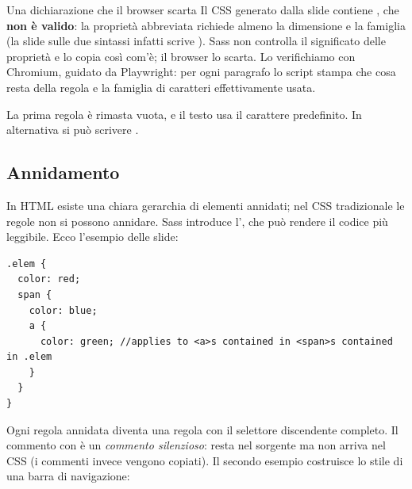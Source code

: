 \begin{warningbox}{{Una dichiarazione che il browser scarta}}
  Il CSS generato dalla slide contiene , che
  \textbf{non è valido}: la proprietà abbreviata  richiede almeno la
  dimensione e la famiglia (la slide sulle due sintassi infatti scrive
  ). Sass non controlla il significato delle
  proprietà e lo copia così com'è; il browser lo scarta. Lo verifichiamo con
  Chromium, guidato da Playwright: per ogni paragrafo lo script stampa che cosa
  resta della regola e la famiglia di caratteri effettivamente usata.


  La prima regola è rimasta vuota, e il testo usa il carattere predefinito. In
  alternativa si può scrivere .
\end{warningbox}

\subsection{Annidamento}

In HTML esiste una chiara gerarchia di elementi annidati; nel CSS tradizionale
le regole non si possono annidare. Sass introduce l', che può
rendere il codice più leggibile. Ecco l'esempio delle slide:

\begin{affianco}[0.55]
\begin{lstlisting}[style=css, name=elem.scss, morecomment={[l]{//}}]
.elem {
  color: red;
  span {
    color: blue;
    a {
      color: green; //applies to <a>s contained in <span>s contained in .elem
    }
  }
}
\end{lstlisting}
\risultato
{}
\end{affianco}

Ogni regola annidata diventa una regola con il selettore discendente completo.
Il commento con \code{//} è un \textit{commento silenzioso}: resta nel sorgente
ma non arriva nel CSS (i commenti \code{/* */} invece vengono copiati). Il
secondo esempio costruisce lo stile di una barra di navigazione:

